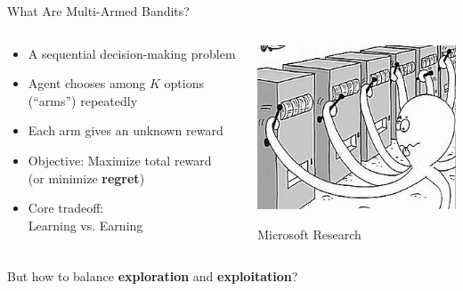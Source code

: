 \documentclass[11pt,table]{beamer}
\begin{document}
\begin{frame}{What Are Multi-Armed Bandits?}
    \begin{columns}
        \begin{column}{0.65\textwidth}
            \begin{itemize}
                \item A sequential decision-making problem
                \item Agent chooses among $K$ options (``arms'') repeatedly
                \item Each arm gives an unknown reward
                \item Objective: Maximize total reward\\ (or minimize \textbf{regret})
                \item Core tradeoff:\\ Learning vs. Earning
            \end{itemize}
        \end{column}
        \begin{column}{0.35\textwidth}
            \centering
            \includegraphics[width=\textwidth]{figures/microsoft research.jpg}
            
            \vspace{0.2em}
            {\scriptsize Microsoft Research}
        \end{column}
    \end{columns}
		\vspace{2ex}
 \pause But how to balance \textbf{exploration} and \textbf{exploitation}?
\end{frame}
\end{document}
